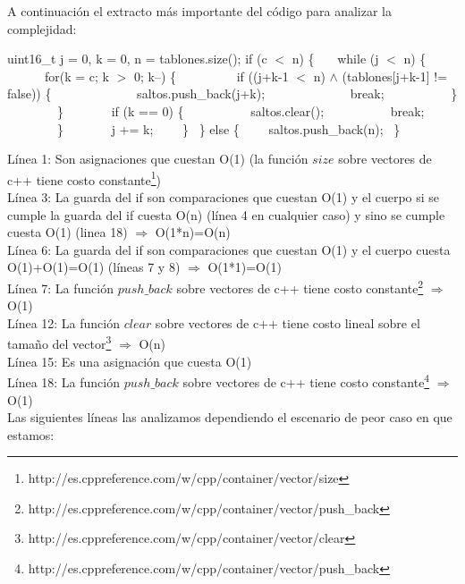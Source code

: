A continuación el extracto más importante del código para analizar la complejidad: 


\begin{codebox}
\li uint16\_t j = 0, k = 0, n = tablones.size();
\li
\li if (c $<$ n) \{
\li \ \ \ while (j $<$ n) \{
\li \ \ \ \ \ \ for(k = c; k $>$ 0; k--) \{
\li \ \ \ \ \ \ \ \ \ if ((j+k-1 $<$ n) $\wedge$ (tablones[j+k-1] != false)) \{
\li \ \ \ \ \ \ \ \ \ \ \ \ \ saltos.push\_back(j+k);
\li \ \ \ \ \ \ \ \ \ \ \ \ \ break;
\li \ \ \ \ \ \ \ \ \ \ \}
\li \ \ \ \ \ \ \ \ \}
\li \ \ \ \ \ \ \ if (k == 0) \{
\li \ \ \ \ \ \ \ \ \ \ saltos.clear();
\li \ \ \ \ \ \ \ \ \ \ break;
\li \ \ \ \ \ \ \ \ \}
\li \ \ \ \ \ \ \ j += k;
\li \ \ \ \ \}
\li \ \} else \{
\li \ \ \ \ saltos.push\_back(n);
\li \ \}
\end{codebox}


Línea 1: Son asignaciones que cuestan O(1) (la función $size$ sobre vectores de c++ tiene costo constante\footnote{http://es.cppreference.com/w/cpp/container/vector/size}) \\
Línea 3: La guarda del if son comparaciones que cuestan O(1) y el cuerpo si se cumple la guarda del if cuesta O(n) (línea 4 en cualquier caso) y sino se cumple cuesta O(1) (linea 18) $\Rightarrow$ O(1*n)=O(n) \\
Línea 6: La guarda del if son comparaciones que cuestan O(1) y el cuerpo cuesta O(1)+O(1)=O(1) (líneas 7 y 8) $\Rightarrow$ O(1*1)=O(1) \\
Línea 7: La función $push\_back$ sobre vectores de c++ tiene costo constante\footnote{http://es.cppreference.com/w/cpp/container/vector/push\_back} $\Rightarrow$ O(1) \\
Línea 12: La función $clear$ sobre vectores de c++ tiene costo lineal sobre el tamaño del vector\footnote{http://es.cppreference.com/w/cpp/container/vector/clear} $\Rightarrow$ O(n) \\
Línea 15: Es una asignación que cuesta O(1) \\
Línea 18: La función $push\_back$ sobre vectores de c++ tiene costo constante\footnote{http://es.cppreference.com/w/cpp/container/vector/push\_back} $\Rightarrow$ O(1) \\




Las siguientes líneas las analizamos dependiendo el escenario de peor caso en que estamos:

